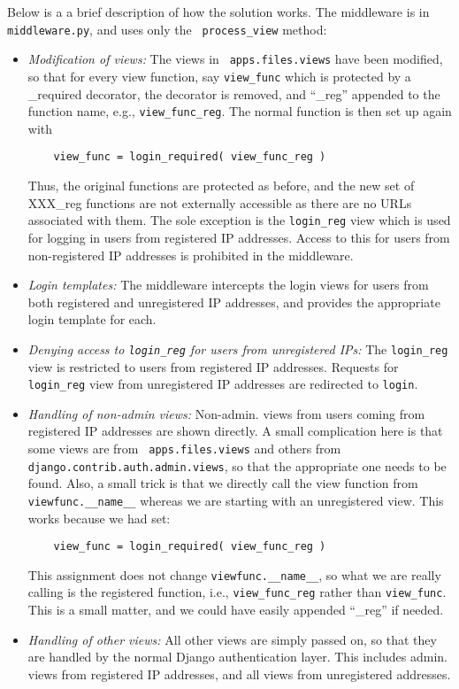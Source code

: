 \label{sec:technical}
Below is a a brief description of how the solution works. The
middleware is in {\tt middleware.py}, and uses only the {\tt
  process\_view} method:
\begin{itemize}
\item \emph{Modification of views: } The views in {\tt
    apps.files.views} have been modified, so that for every view
  function, say {\tt view\_func} which is protected by a
  \@login\_required decorator, the decorator is removed, and ``\_reg''
  appended to the function name, e.g., {\tt view\_func\_reg}. The
  normal function is then set up again with
  \begin{Verbatim}
    view_func = login_required( view_func_reg )
  \end{Verbatim}
  Thus, the original functions are protected as before, and the
  new set of XXX\_reg functions are not externally accessible as
  there are no URLs associated with them. The sole exception is
  the {\tt login\_reg} view which is used for logging in users from
  registered IP addresses. Access to this for users from
  non-registered IP addresses is prohibited in the middleware. 
\item \emph{Login templates: } The middleware intercepts the
  login views for users from both registered and unregistered IP
  addresses, and provides the appropriate login template for
  each.
\item \emph{Denying access to {\tt login\_reg} for users from
    unregistered IPs: } The {\tt login\_reg} view is restricted to users
  from registered IP addresses. Requests for {\tt login\_reg}
  view from unregistered IP addresses are redirected to {\tt login}.
\item \emph{Handling of non-admin views: } Non-admin. views from
  users coming from registered IP addresses are shown directly. A
  small complication here is that some views are from {\tt
    apps.files.views} and others from {\tt
    django.contrib.auth.admin.views}, so that the appropriate one
  needs to be found. Also, a small trick is that we directly call
  the view function from {\tt viewfunc.\_\_name\_\_} whereas we
  are starting with an unregistered view. This works because we
  had set:
  \begin{Verbatim}
    view_func = login_required( view_func_reg )
  \end{Verbatim}
  This assignment does not change {\tt viewfunc.\_\_name\_\_}, so
  what we are really calling is the registered function, i.e.,
  {\tt view\_func\_reg} rather than {\tt view\_func}. This is a
  small matter, and we could have easily appended ``\_reg'' if
  needed.
\item \emph{Handling of other views: } All other views are simply
  passed on, so that they are handled by the normal Django
  authentication layer. This includes admin. views from registered
  IP addresses, and all views from unregistered addresses.
\end{itemize}
